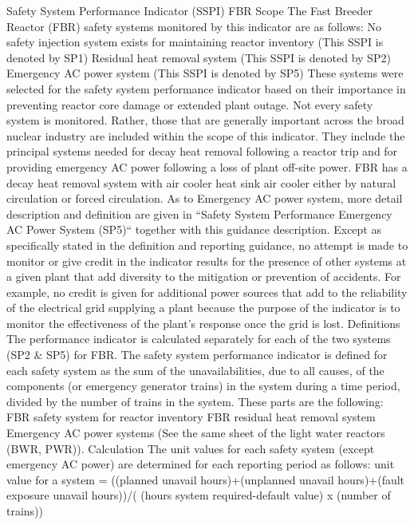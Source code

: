 Safety System Performance Indicator (SSPI) FBR
Scope
The Fast Breeder Reactor (FBR) safety systems monitored by this indicator are as follows:
No safety injection system exists for maintaining reactor inventory (This SSPI is denoted by SP1)
Residual heat removal system (This SSPI is denoted by SP2)
Emergency AC power system (This SSPI is denoted by SP5)
These systems were selected for the safety system performance indicator based on their importance in preventing reactor core damage or extended plant outage.  Not every safety system is monitored.  Rather, those that are generally important across the broad nuclear industry are included within the scope of this indicator. They include the principal systems needed for decay heat removal following a reactor trip and for providing emergency AC power following a loss of plant off-site power. FBR has a decay heat removal system with air cooler heat sink air cooler either by natural circulation or forced circulation.
As to Emergency AC power system, more detail description and definition are given in “Safety System Performance   Emergency AC Power System (SP5)“ together with this guidance description.
Except as specifically stated in the definition and reporting guidance, no attempt is made to monitor or give credit in the indicator results for the presence of other systems at a given plant that add diversity to the mitigation or prevention of accidents.  For example, no credit is given for additional power sources that add to the reliability of the electrical grid supplying a plant because the purpose of the indicator is to monitor the effectiveness of the plant's response once the grid is lost.
Definitions
The performance indicator is calculated separately for each of the two systems (SP2 \& SP5) for FBR.  The safety system performance indicator is defined for each safety system as the sum of the unavailabilities, due to all causes, of the components (or emergency generator trains) in the system during a time period, divided by the number of trains in the system.
These parts are the following:
FBR safety system for reactor inventory
FBR residual heat removal system
Emergency AC power systems (See the same sheet of the light water reactors (BWR, PWR)).
Calculation
The unit values for each safety system (except emergency AC power) are determined for each reporting period as follows:
unit value for a system =  ((planned unavail hours)+(unplanned unavail hours)+(fault exposure unavail hours))/( (hours system required-default value) x (number of trains))

